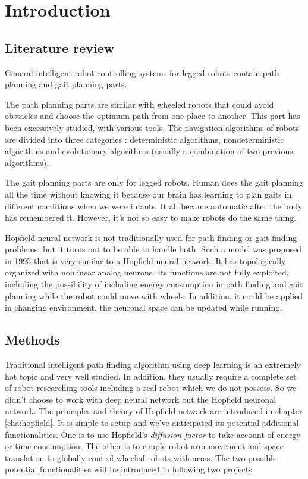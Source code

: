 \chapter{Introduction}
\label{cha:introduction}
\section{Literature review}
\label{sec:review}

General intelligent robot controlling systems for legged robots contain path planning and gait planning parts. 

The path planning parts are similar with wheeled robots that could avoid obstacles and choose the optimum path from one place to another.
This part has been excessively studied, with various tools. 
The navigation algorithms of robots are divided into three categories\cite{RN9} :
deterministic algorithms, nondeterministic algorithms and evolutionary algorithms (usually a combination of two previous algorithms). 

The gait planning parts are only for legged robots. 
Human does the gait planning all the time without knowing it because our brain has learning to plan gaits in different conditions when we were infants. 
It all became automatic after the body has remembered it. 
However, it's not so easy to make robots do the same thing.

Hopfield neural network is not traditionally used for path finding or gait finding problems, but it turns out to be able to handle both. 
Such a model was proposed in 1995 \cite{RN11} that is very similar to a Hopfield neural network. 
It has topologically organized with nonlinear analog neurons. 
Its functions are not fully exploited, including the possibility of including energy consumption in path finding and gait planning while the robot could move with wheels. 
In addition, it could be applied in changing environment, the neuronal space can be updated while running.
\section{Methods}
\label{sec:method}
Traditional intelligent path finding algorithm using deep learning is an extremely hot topic and very well studied.
In addition, they usually require a complete set of robot researching tools including a real robot which we do not possess.
So we didn't choose to work with deep neural network but the Hopfield neuronal network.
The principles and theory of Hopfield network are introduced in chapter \ref{cha:hopfield}.
It is simple to setup and we've anticipated its potential additional functionalities.
One is to use Hopfield's \textit{diffusion factor} to take account of energy or time consumption.
The other is to couple robot arm movement and space translation to globally control wheeled robots with arms.
The two possible potential functionalities will be introduced in following two projects.


